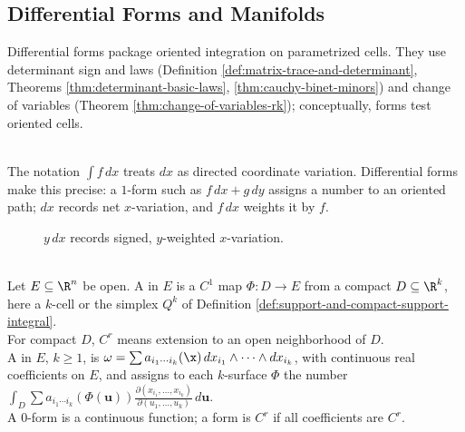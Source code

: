 \subsection{Differential Forms and Manifolds}

Differential forms package oriented integration on parametrized cells. They use determinant sign and laws (Definition \ref{def:matrix-trace-and-determinant}, Theorems \ref{thm:determinant-basic-laws}, \ref{thm:cauchy-binet-minors}) and change of variables (Theorem \ref{thm:change-of-variables-rk}); conceptually, forms test oriented cells.

\begin{perspective} \label{per:differential-forms-as-functionals} \\
The notation $\int f\,dx$ treats $dx$ as directed coordinate variation. Differential forms make this precise: a $1$-form such as $f\,dx+g\,dy$ assigns a number to an oriented path; $dx$ records net $x$-variation, and $f\,dx$ weights it by $f$.
\end{perspective}

\begin{figure}[H]
  \centering
  
  \caption{$y\,dx$ records signed, $y$-weighted $x$-variation.}
  \label{fig:forms-weighted-variation-paths}
\end{figure}

\begin{definition} \label{def:forms-manifolds-core-source-todo}\label{def:k-surfaces-and-differential-forms} \\
Let $E\subseteq\R^n$ be open. A  in $E$ is a $C^1$ map $\Phi:D\to E$ from a compact  $D\subseteq\R^k$, here a $k$-cell or the simplex $Q^k$ of Definition \ref{def:support-and-compact-support-integral}.\\
For compact $D$, $C^r$ means extension to an open neighborhood of $D$.\\
A  in $E$, $k\geq1$, is $\omega=\sum a_{i_1\cdots i_k}(\x)\,dx_{i_1}\wedge\cdots\wedge dx_{i_k}$, with continuous real coefficients on $E$, and assigns to each $k$-surface $\Phi$ the number $\int_D \sum a_{i_1\cdots i_k}(\Phi(\mathbf{u})) \frac{\partial(x_{i_1},\ldots,x_{i_k})}{\partial(u_1,\ldots,u_k)}\,d\mathbf{u}$.\\
A $0$-form is a continuous function; a form is $C^r$ if all coefficients are $C^r$.
\end{definition}

